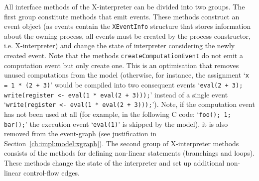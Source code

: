 All interface methods of the X-interpreter can be divided into two groups.
The first group constitute methods that emit events.
These methods construct an event object (as events contain the \texttt{XEventInfo} structure that stores information about the owning process, all events must be created by the process constructor, i.e. X-interpreter) and change the state of interpreter considering the newly created event.
Note that the methods \lstinline{createComputationEvent} do not emit a computation event but only create one.
This is an optimisation that removes unused computations from the model
(otherwise, for instance, the assignment `\lstinline{x = 1 * (2 + 3)}' would be compiled into two consequent events `\lstinline{eval(2 + 3); write(register <- eval(1 * eval(2 + 3)));}' instead of a single event `\lstinline{write(register <- eval(1 * eval(2 + 3)));}').
Note, if the computation event has not been used at all (for example, in the following C code: `\lstinline{foo(); 1; bar();}' the execution event `\lstinline{eval(1)}' is skipped by the model), it is also removed from the event-graph (see justification in Section~\ref{ch:impl:model:xgraph}).
The second group of X-interpreter methods consists of the methods for defining non-linear statements (branchings and loops).
These methods change the state of the interpreter and set up additional non-linear control-flow edges.

